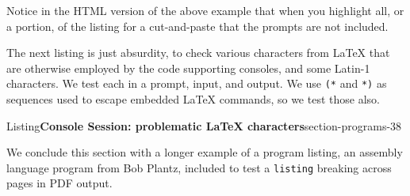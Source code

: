 \documentclass[pdflatex]{sn-jnl}
\theoremstyle{thmstyleone}%
\theoremstyle{thmstyletwo}%
\theoremstyle{thmstylethree}%
\newcommand{\mono}[1]{\texttt{#1}}
\numberwithin{equation}{section}
\newcommand{\consoleinput}[1]{\textbf{#1}}
\begin{document}
Notice in the HTML version of the above example that when you highlight all, or a portion, of the listing for a cut-and-paste that the prompts are not included.%
\par
The next listing is just absurdity, to check various characters from \LaTeX{} that are otherwise employed by the code supporting consoles, and some Latin-1 characters.  We test each in a prompt, input, and output.  We use \mono{(*} and \mono{*)} as sequences used to escape embedded \LaTeX{} commands, so we test those also.%
\begin{listingptx}{Listing}{\textbf{Console Session: problematic \LaTeX{} characters}}{section-programs-38}{}%
\begin{console}{0}{1}{0}
A backslash \ here  (*\consoleinput{A backslash \textbackslash{} here}*)
A backslash \ here
A begin group { here  (*\consoleinput{A begin group \{ here}*)
A begin group { here
An end group { here  (*\consoleinput{An end group \} here}*)
An end group } here
An open escape sequence (*({}**) here  (*\consoleinput{An open escape sequence ({}*{} here}*)
An open escape sequence (*({}**) here
An end escape sequence (**{})*) here  (*\consoleinput{An end escape sequence *{}){} here}*)
An end escape sequence (**{})*) here
Some quotation marks ` ' " here  (*\consoleinput{Some quotation marks \textasciigrave{} \textquotesingle{} \textquotedbl{} here}*)
Some quotation marks ` ' " here
The rest & %
The rest & %
Latin-1: ÆÇÈÉÊËÌÍÎÏÐÑÒÓÔÕÖ×ØÙÚÛÜÝÞß  (*\consoleinput{Latin-1: ÆÇÈÉÊËÌÍÎÏÐÑÒÓÔÕÖ×ØÙÚÛÜÝÞß}*)
Latin-1: ÆÇÈÉÊËÌÍÎÏÐÑÒÓÔÕÖ×ØÙÚÛÜÝÞß
\end{console}
\end{listingptx}%
We conclude this section with a longer example of a program listing, an assembly language program from Bob Plantz, included to test a \mono{listing} breaking across pages in PDF output.%
\end{document}

